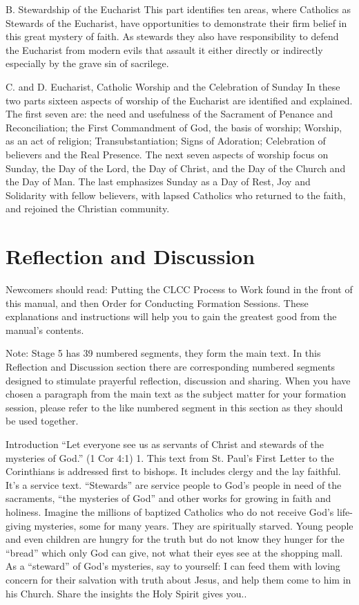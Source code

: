 \documentclass[oneside]{book}
\begin{document}
B. Stewardship of the Eucharist
This part identifies ten areas, where Catholics as Stewards of the Eucharist,
have opportunities to demonstrate their firm belief in this great mystery of
faith. As stewards they also have responsibility to defend the Eucharist from
modern evils that assault it either directly or indirectly especially by the
grave sin of sacrilege.

C. and D. Eucharist, Catholic Worship and the Celebration of Sunday
In these two parts sixteen aspects of worship of the Eucharist are identified
and explained. The first seven are: the need and usefulness of the Sacrament of
Penance and Reconciliation; the First Commandment of God, the basis of worship;
Worship, as an act of religion; Transubstantiation; Signs of Adoration;
Celebration of believers and the Real Presence. The next seven aspects of
worship focus on Sunday, the Day of the Lord, the Day of Christ, and the Day of
the Church and the Day of Man. The last emphasizes Sunday as a Day of Rest, Joy
and Solidarity with fellow believers, with lapsed Catholics who returned to the
faith, and rejoined the Christian community.


\section{Reflection and Discussion}

Newcomers should read: Putting the CLCC Process to Work found in the front of
this manual, and then Order for Conducting Formation Sessions. These
explanations and instructions will help you to gain the greatest good from the
manual's contents.

Note: Stage 5 has 39 numbered segments, they form the main text. In this
Reflection and Discussion section there are corresponding numbered segments
designed to stimulate prayerful reflection, discussion and sharing. When you
have chosen a paragraph from the main text as the subject matter for your
formation session, please refer to the like numbered segment in this section as
they should be used together.

Introduction
``Let everyone see us as servants of Christ and stewards of the
  mysteries of God.'' (1 Cor 4:1)
1. This text from St. Paul's First Letter to the Corinthians is addressed first
to bishops. It includes clergy and the lay faithful. It's a service
text. ``Stewards'' are service people to God's people in need of the sacraments,
``the mysteries of God'' and other works for growing in faith and
holiness. Imagine the millions of baptized Catholics who do not receive God's
life-giving mysteries, some for many years. They are spiritually starved. Young
people and even children are hungry for the truth but do not know they hunger
for the ``bread'' which only God can give, not what their eyes see at the
shopping mall. As a ``steward'' of God's mysteries, say to yourself: I can feed
them with loving concern for their salvation with truth about Jesus, and help
them come to him in his Church. Share the insights the Holy Spirit gives you..
\end{document}

